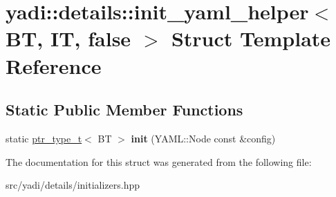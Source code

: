 \hypertarget{structyadi_1_1details_1_1init__yaml__helper_3_01_b_t_00_01_i_t_00_01false_01_4}{}\section{yadi\+:\+:details\+:\+:init\+\_\+yaml\+\_\+helper$<$ BT, IT, false $>$ Struct Template Reference}
\label{structyadi_1_1details_1_1init__yaml__helper_3_01_b_t_00_01_i_t_00_01false_01_4}
\subsection*{Static Public Member Functions}
\begin{DoxyCompactItemize}
\item 
\mbox{\label{structyadi_1_1details_1_1init__yaml__helper_3_01_b_t_00_01_i_t_00_01false_01_4_a056433bd33067957aba92754dbe1f3a2}} 
static \hyperlink{namespaceyadi_a92290eb27cd90666aa87b17d854af9fe}{ptr\+\_\+type\+\_\+t}$<$ BT $>$ {\bfseries init} (Y\+A\+M\+L\+::\+Node const \&config)
\end{DoxyCompactItemize}


The documentation for this struct was generated from the following file\+:\begin{DoxyCompactItemize}
\item 
src/yadi/details/initializers.\+hpp\end{DoxyCompactItemize}
